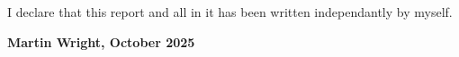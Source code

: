I declare that this report and all in it has been written independantly by myself.

\textbf{Martin Wright, October 2025}